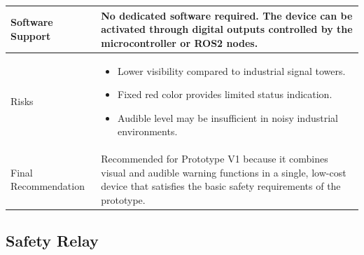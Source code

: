 \documentclass[12pt,a4paper]{article}
\begin{document}
\begin{longtable}{|p{4cm}|p{10cm}|}
Software Support &
No dedicated software required. The device can be activated through digital outputs controlled by the microcontroller or ROS2 nodes. \\ 
\hline 

Risks &
\begin{itemize} 
\item Lower visibility compared to industrial signal towers. 
\item Fixed red color provides limited status indication. 
\item Audible level may be insufficient in noisy industrial environments. 
\end{itemize} \\ 
\hline 

Final Recommendation &
Recommended for Prototype V1 because it combines visual and audible warning functions in a single, low-cost device that satisfies the basic safety requirements of the prototype. \\ 
\hline

\end{longtable}

\subsection{Safety Relay}
\end{document}

